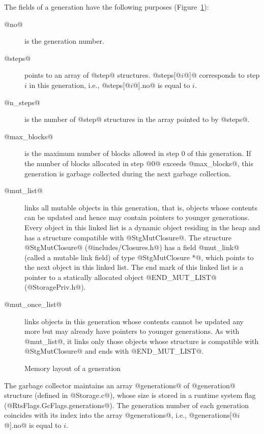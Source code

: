 \documentclass{article}
\begin{document}
The fields of a generation have the following purposes (Figure~\ref{fig-gen}):

\begin{description}
\item[@no@] is the generation number.
\item[@steps@] points to an array of @step@ structures. @steps[@$i$@]@ 
corresponds to step $i$ in this generation, i.e., 
@steps[@$i$@].no@ is equal to $i$.
\item[@n\_steps@] is the number of @step@ structures in the array pointed to 
by @steps@.
\item[@max\_blocks@] is the maximum number of blocks allowed in step $0$ of
this generation. If the number of blocks allocated 
in step @0@ exceeds @max_blocks@,
this generation is garbage collected during the next garbage collection.
\item[@mut\_list@] links all mutable objects in this generation, that is,
objects whose contents can be updated and hence may contain pointers to
younger generations. 
Every object in this linked list is a dynamic object residing in the heap 
and has a structure compatible with @StgMutClosure@.
The structure @StgMutClosure@ (@includes/Closures.h@) has a field 
@mut_link@ (called a mutable link field) of type @StgMutClosure *@, which
points to the next object in this linked list.
The end mark of this linked list is a pointer to a statically allocated object 
@END_MUT_LIST@ (@StoragePriv.h@).
\item[@mut\_once\_list@] links objects in this generation whose contents 
cannot be updated any more but may already have pointers to younger generations.
As with @mut_list@, it links only those objects whose structure is compatible
with @StgMutClosure@ and ends with @END_MUT_LIST@.
\end{description}

\begin{figure}[ht]
\begin{center}

\caption{Memory layout of a generation}
\label{fig-gen}
\end{center}
\end{figure}

The garbage collector maintains an array @generations@ of @generation@ structure
(defined in @Storage.c@), whose size is stored in a runtime system flag 
(@RtsFlags.GcFlags.generations@). 
The generation number of each generation coincides with its index into
the array @generations@, i.e.,  @generations[@$i$@].no@ is equal to $i$.
\end{document}
